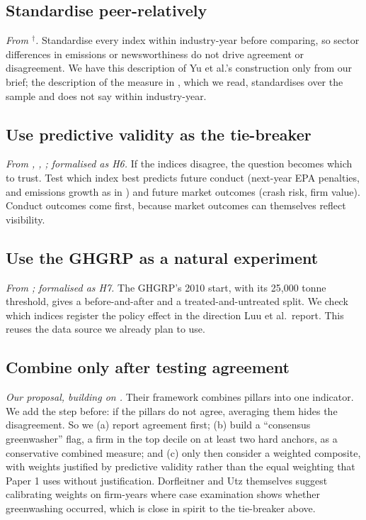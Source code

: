 \documentclass[12pt,a4paper]{article}
\newcommand{\dg}{$^{\dagger}$}          %
\begin{document}
\subsection{Standardise peer-relatively}
\emph{From \citet{yu2020}\dg.} Standardise every index within industry-year before comparing, so
sector differences in emissions or newsworthiness do not drive agreement or disagreement. We have
this description of Yu et al.'s construction only from our brief; the description of the measure in
\citet{luu2025}, which we read, standardises over the sample and does not say within industry-year.

\subsection{Use predictive validity as the tie-breaker}
\emph{From \citet{liu2024}, \citet{ghitti2024}, \citet{bacher2025}; formalised as H6.} If the indices
disagree, the question becomes which to trust. Test which index best predicts future conduct
(next-year EPA penalties, and emissions growth as in \citealp{bingler2024}) and future market
outcomes (crash risk, firm value). Conduct outcomes come first, because market outcomes can
themselves reflect visibility.

\subsection{Use the GHGRP as a natural experiment}
\emph{From \citet{luu2025}; formalised as H7.} The GHGRP's 2010 start, with its 25,000 tonne
threshold, gives a before-and-after and a treated-and-untreated split. We check which indices
register the policy effect in the direction Luu et al.\ report. This reuses the data source we
already plan to use.

\subsection{Combine only after testing agreement}
\emph{Our proposal, building on \citet{dorfleitner2024}.} Their framework combines pillars into one
indicator. We add the step before: if the pillars do not agree, averaging them hides the
disagreement. So we (a) report agreement first; (b) build a ``consensus greenwasher'' flag, a firm in
the top decile on at least two hard anchors, as a conservative combined measure; and (c) only then
consider a weighted composite, with weights justified by predictive validity rather than the equal
weighting that Paper 1 uses without justification. Dorfleitner and Utz themselves suggest calibrating
weights on firm-years where case examination shows whether greenwashing occurred, which is close in
spirit to the tie-breaker above.
\end{document}
